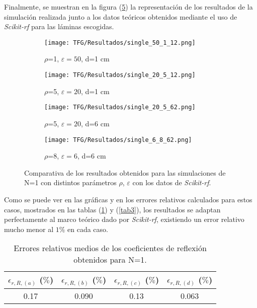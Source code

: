 \documentclass[11pt,a4paper,twoside,pdf]{article}
\numberwithin{equation}{section}
\begin{document}
Finalmente, se muestran en la figura (\ref{fig9}) la representación de los resultados de la simulación realizada junto a los datos teóricos obtenidos mediante el uso de \textit{Scikit-rf} para las láminas escogidas.
\newpage
\begin{figure}[H]
    \centering
        \begin{subfigure}[b]{0.475\textwidth}
        \centering
        \texttt{[image: TFG/Resultados/single\_50\_1\_12.png]}
        \caption{$\rho$=1, $\varepsilon=50$, d=1 cm}
        \label{f:gato}
    \end{subfigure}
    \hfill
    \begin{subfigure}[b]{0.475\textwidth}
        \centering
        \texttt{[image: TFG/Resultados/single\_20\_5\_12.png]}
        \caption{$\rho$=5, $\varepsilon=20$, d=1 cm}
        \label{f:tigre}
    \end{subfigure}

        \begin{subfigure}[b]{0.475\textwidth}
        \centering
        \texttt{[image: TFG/Resultados/single\_20\_5\_62.png]}
        \caption{$\rho$=5, $\varepsilon=20$, d=6 cm}
        \label{f:gato}
    \end{subfigure}
    \hfill
    \begin{subfigure}[b]{0.475\textwidth}
        \centering
        \texttt{[image: TFG/Resultados/single\_6\_8\_62.png]}
        \caption{$\rho$=8, $\varepsilon=6$, d=6 cm}
        \label{f:tigre}
    \end{subfigure}
    \caption{Comparativa de los resultados obtenidos para las simulaciones de N=1 con distintos parámetros $\rho$, $\varepsilon$ con los datos de \textit{Scikit-rf}.}
    \label{fig9}
\end{figure}
Como se puede ver en las gráficas y en los errores relativos calculados para estos casos, mostrados en las tablas (\ref{tab2}) y (\ref{tab3}), los resultados se adaptan perfectamente al marco teórico dado por \textit{Scikit-rf}, existiendo un error relativo mucho menor al $1\%$ en cada caso.
\begin{table}[H]
\centering
\begin{tabular}{|c|c|c|c|}
\hline
\textbf{$\epsilon_{r,R,(a)}$ ($\%$)} & \textbf{$\epsilon_{r,R,(b)}$ ($\%$)} & \textbf{$\epsilon_{r,R,(c)}$ ($\%$)} & \textbf{$\epsilon_{r,R,(d)}$ ($\%$)} \\ \hline
0.17                                 & 0.090                                & 0.13                                 & 0.063                                \\ \hline
\end{tabular}
\caption{Errores relativos medios de los coeficientes de reflexión obtenidos para N=1.}
\label{tab2}
\end{table}
\end{document}
